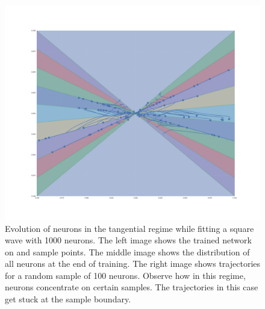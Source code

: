 \begin{figure}
    \endminipage\hfill
    \includegraphics[width=\linewidth]{figures/neuron_trajectories.pdf}
    \endminipage
    \caption{Evolution of neurons in the tangential regime while fitting a square wave with 1000 neurons. The left image shows the trained network on and sample points. The middle image shows the distribution of all neurons at the end of training. The right image shows trajectories for a random sample of 100 neurons. Observe how in this regime, neurons concentrate on certain samples. The trajectories in this case get stuck at the sample boundary.}
    \label{fig:tangential_trajectories}
\end{figure}


